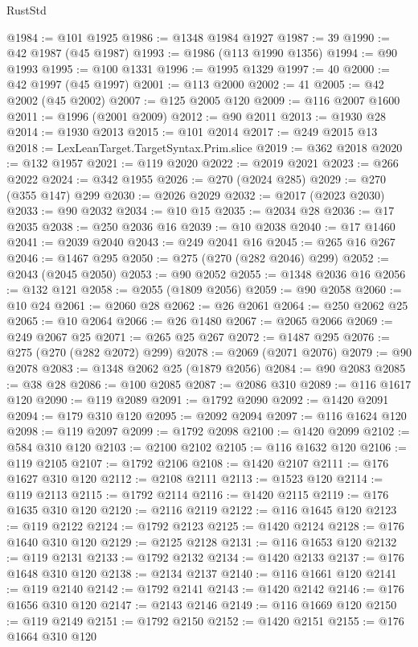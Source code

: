 \begin{lexlean}{RustStd}
\begin{coremodule}
@1984 := @101 @1925
@1986 := @1348 @1984 @1927
@1987 := 39
@1990 := @42 @1987 (@45 @1987)
@1993 := @1986 (@113 @1990 @1356)
@1994 := @90 @1993
@1995 := @100 @1331
@1996 := @1995 @1329
@1997 := 40
@2000 := @42 @1997 (@45 @1997)
@2001 := @113 @2000
@2002 := 41
@2005 := @42 @2002 (@45 @2002)
@2007 := @125 @2005 @120
@2009 := @116 @2007 @1600
@2011 := @1996 (@2001 @2009)
@2012 := @90 @2011
@2013 := @1930 @28
@2014 := @1930 @2013
@2015 := @101 @2014
@2017 := @249 @2015 @13
@2018 := LexLeanTarget.TargetSyntax.Prim.slice
@2019 := @362 @2018
@2020 := @132 @1957
@2021 := @119 @2020
@2022 := @2019 @2021
@2023 := @266 @2022
@2024 := @342 @1955
@2026 := @270 (@2024 @285)
@2029 := @270 (@355 @147) @299
@2030 := @2026 @2029
@2032 := @2017 (@2023 @2030)
@2033 := @90 @2032
@2034 := @10 @15
@2035 := @2034 @28
@2036 := @17 @2035
@2038 := @250 @2036 @16
@2039 := @10 @2038
@2040 := @17 @1460
@2041 := @2039 @2040
@2043 := @249 @2041 @16
@2045 := @265 @16 @267
@2046 := @1467 @295
@2050 := @275 (@270 (@282 @2046) @299)
@2052 := @2043 (@2045 @2050)
@2053 := @90 @2052
@2055 := @1348 @2036 @16
@2056 := @132 @121
@2058 := @2055 (@1809 @2056)
@2059 := @90 @2058
@2060 := @10 @24
@2061 := @2060 @28
@2062 := @26 @2061
@2064 := @250 @2062 @25
@2065 := @10 @2064
@2066 := @26 @1480
@2067 := @2065 @2066
@2069 := @249 @2067 @25
@2071 := @265 @25 @267
@2072 := @1487 @295
@2076 := @275 (@270 (@282 @2072) @299)
@2078 := @2069 (@2071 @2076)
@2079 := @90 @2078
@2083 := @1348 @2062 @25 (@1879 @2056)
@2084 := @90 @2083
@2085 := @38 @28
@2086 := @100 @2085
@2087 := @2086 @310
@2089 := @116 @1617 @120
@2090 := @119 @2089
@2091 := @1792 @2090
@2092 := @1420 @2091
@2094 := @179 @310 @120
@2095 := @2092 @2094
@2097 := @116 @1624 @120
@2098 := @119 @2097
@2099 := @1792 @2098
@2100 := @1420 @2099
@2102 := @584 @310 @120
@2103 := @2100 @2102
@2105 := @116 @1632 @120
@2106 := @119 @2105
@2107 := @1792 @2106
@2108 := @1420 @2107
@2111 := @176 @1627 @310 @120
@2112 := @2108 @2111
@2113 := @1523 @120
@2114 := @119 @2113
@2115 := @1792 @2114
@2116 := @1420 @2115
@2119 := @176 @1635 @310 @120
@2120 := @2116 @2119
@2122 := @116 @1645 @120
@2123 := @119 @2122
@2124 := @1792 @2123
@2125 := @1420 @2124
@2128 := @176 @1640 @310 @120
@2129 := @2125 @2128
@2131 := @116 @1653 @120
@2132 := @119 @2131
@2133 := @1792 @2132
@2134 := @1420 @2133
@2137 := @176 @1648 @310 @120
@2138 := @2134 @2137
@2140 := @116 @1661 @120
@2141 := @119 @2140
@2142 := @1792 @2141
@2143 := @1420 @2142
@2146 := @176 @1656 @310 @120
@2147 := @2143 @2146
@2149 := @116 @1669 @120
@2150 := @119 @2149
@2151 := @1792 @2150
@2152 := @1420 @2151
@2155 := @176 @1664 @310 @120

\end{coremodule}
\end{lexlean}
